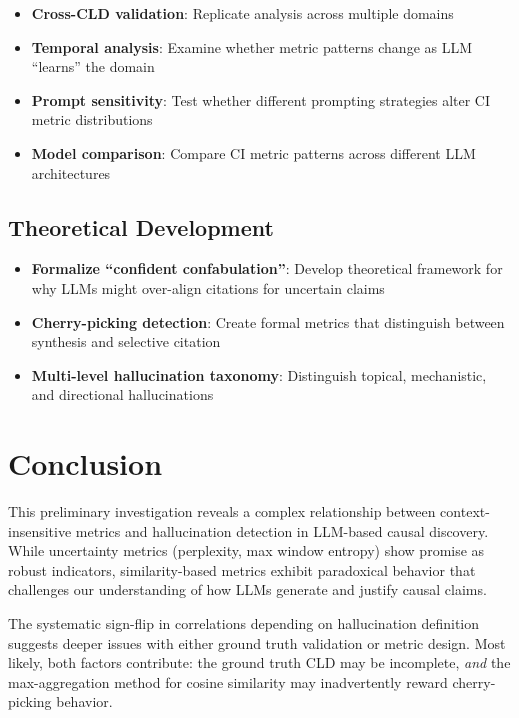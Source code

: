\begin{itemize}
    \item \textbf{Cross-CLD validation}: Replicate analysis across multiple domains
    
    \item \textbf{Temporal analysis}: Examine whether metric patterns change as LLM ``learns'' the domain
    
    \item \textbf{Prompt sensitivity}: Test whether different prompting strategies alter CI metric distributions
    
    \item \textbf{Model comparison}: Compare CI metric patterns across different LLM architectures
\end{itemize}

\subsection{Theoretical Development}

\begin{itemize}
    \item \textbf{Formalize ``confident confabulation''}: Develop theoretical framework for why LLMs might over-align citations for uncertain claims
    
    \item \textbf{Cherry-picking detection}: Create formal metrics that distinguish between synthesis and selective citation
    
    \item \textbf{Multi-level hallucination taxonomy}: Distinguish topical, mechanistic, and directional hallucinations
\end{itemize}

\section{Conclusion}

This preliminary investigation reveals a complex relationship between context-insensitive metrics and hallucination detection in LLM-based causal discovery. While uncertainty metrics (perplexity, max window entropy) show promise as robust indicators, similarity-based metrics exhibit paradoxical behavior that challenges our understanding of how LLMs generate and justify causal claims.

The systematic sign-flip in correlations depending on hallucination definition suggests deeper issues with either ground truth validation or metric design. Most likely, both factors contribute: the ground truth CLD may be incomplete, \textit{and} the max-aggregation method for cosine similarity may inadvertently reward cherry-picking behavior.

